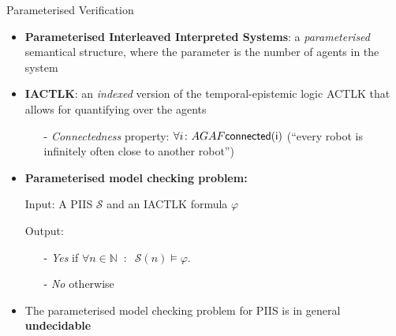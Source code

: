 \documentclass[10pt]{beamer}
\begin{document}
\begin{frame}{Parameterised Verification}

    \begin{itemize} \itemsep 1em 

        \item {\bf Parameterised Interleaved Interpreted Systems}: a {\em
    parameterised} semantical structure, where the parameter is the number of
    agents in the system

    \item {\bf IACTLK}: an \emph{indexed} version of the
        temporal-epistemic logic  ACTLK that allows for quantifying over 
        the agents
        \begin{itemize}
            \item[\textcolor{black}{-}] {\em Connectedness} property:
                $\forall i \colon AGAF\sf{connected}(i)$
            (``every robot is infinitely often close to another robot'')
        \end{itemize}

\item {\bf Parameterised model checking problem:}

	Input: A PIIS  $\mathcal{S}$  and an IACTLK formula $\varphi$

	Output:
	\begin{itemize}
        \item[\textcolor{black}{-}] {\em Yes} if $\forall n \in \mathbb{N} \;\; \colon \;\;
			\mathcal{S}(n) \models
	 \varphi$.
        \item[\textcolor{black}{-}] {\em No} otherwise
	\end{itemize}

\item The parameterised model checking problem for PIIS  is in general {\bf
    undecidable}
    \end{itemize} 

\end{frame}

\end{document}
